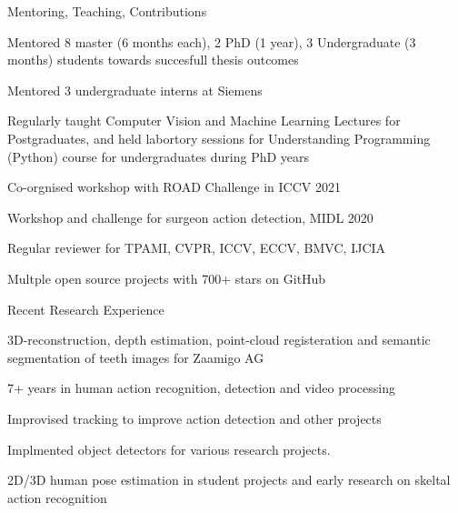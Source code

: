 \documentclass{resume} %
\begin{document}
\begin{multicols}{2}
\begin{mSection}{Mentoring, Teaching, Contributions}{} 
  \begin{sSubsection}{Mentored 8 master (6 months each), 2 PhD (1 year), 3 Undergraduate (3 months) students towards succesfull thesis outcomes}\end{sSubsection}
  \begin{sSubsection}{Mentored 3 undergraduate interns at Siemens}\end{sSubsection}
  \begin{sSubsection}{Regularly taught Computer Vision and Machine Learning Lectures for Postgraduates, 
    and held labortory sessions for Understanding Programming (Python) course for undergraduates during PhD years}\end{sSubsection}
  \begin{sSubsection}{Co-orgnised workshop with ROAD Challenge in ICCV 2021}\end{sSubsection}
  \begin{sSubsection}{Workshop and challenge for surgeon action detection, MIDL 2020}\end{sSubsection}
  \begin{sSubsection}{Regular reviewer for TPAMI, CVPR, ICCV, ECCV, BMVC, IJCIA}\end{sSubsection}
  \begin{sSubsection}{Multple open source projects with 700+ stars on GitHub}\end{sSubsection}
\end{mSection}

\begin{mSection}{Recent Research Experience}{} 
  \begin{sSubsection}{3D-reconstruction, depth estimation, point-cloud registeration and semantic segmentation of teeth images for Zaamigo AG}\end{sSubsection}
  \begin{sSubsection}{7+ years in human action recognition, detection and  video processing}\end{sSubsection}
  \begin{sSubsection}{Improvised tracking to improve action detection and other projects}\end{sSubsection}
  \begin{sSubsection}{Implmented object detectors for various research projects.}\end{sSubsection}
  \begin{sSubsection}{2D/3D human pose estimation in student projects and early research on skeltal action recognition}\end{sSubsection}

\end{mSection}

\end{multicols}
\end{document}
